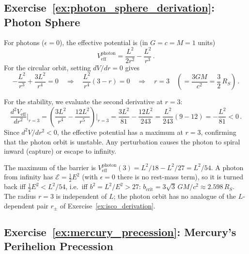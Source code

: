 \subsection*{Exercise~\ref{ex:photon_sphere_derivation}: Photon Sphere}

For photons ($\epsilon = 0$), the effective potential is (in $G = c = M = 1$ units)
\begin{equation*}
    V_{\mathrm{eff}}^{\mathrm{photon}} = \frac{L^2}{2r^2} - \frac{L^2}{r^3} \,.
\end{equation*}
For the circular orbit, setting $dV/dr = 0$ gives
\begin{equation*}
    -\frac{L^2}{r^3} + \frac{3L^2}{r^4} = 0
    \quad\Longrightarrow\quad
    \frac{L^2}{r^4}(3 - r) = 0
    \quad\Longrightarrow\quad
    \boxed{r = 3}
    \quad\left(= \frac{3GM}{c^2} = \frac{3}{2}\,R_S\right) \,.
\end{equation*}

For the stability, we evaluate the second derivative at $r = 3$:
\begin{equation*}
    \frac{d^2 V_{\mathrm{eff}}}{dr^2}\bigg|_{r=3}
    = \left(\frac{3L^2}{r^4} - \frac{12L^2}{r^5}\right)\bigg|_{r=3}
    = \frac{3L^2}{81} - \frac{12L^2}{243}
    = \frac{L^2}{243}(9 - 12)
    = -\frac{L^2}{81} < 0 \,.
\end{equation*}
Since $d^2V/dr^2 < 0$, the effective potential has a maximum
at $r = 3$, confirming that the photon orbit is unstable.
Any perturbation causes the photon to spiral inward (capture) or
escape to infinity.

\begin{annotation}
The maximum of the barrier is
$V^{\mathrm{photon}}_{\mathrm{eff}}(3) = L^2/18 - L^2/27 = L^2/54$.  A photon
from infinity has $\mathcal{E} = \tfrac12E^2$ (with $\epsilon = 0$ there is
no rest-mass term), so it is turned back iff $\tfrac12E^2 < L^2/54$, i.e.\
iff $b^2 = L^2/E^2 > 27$: $b_{\mathrm{crit}} = 3\sqrt3\,GM/c^2 \approx
2.598\,R_S$.  The radius $r = 3$ is independent of $L$; the photon orbit
has no analogue of the $L$-dependent pair $r_\pm$ of Exercise~\ref{ex:isco_derivation}.
\end{annotation}


\subsection*{Exercise~\ref{ex:mercury_precession}: Mercury's Perihelion Precession}


